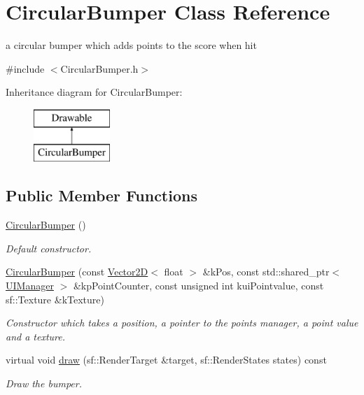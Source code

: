 \hypertarget{class_circular_bumper}{\section{Circular\+Bumper Class Reference}
\label{class_circular_bumper}
}


a circular bumper which adds points to the score when hit  




{\ttfamily \#include $<$Circular\+Bumper.\+h$>$}

Inheritance diagram for Circular\+Bumper\+:\begin{figure}[H]
\begin{center}
\leavevmode
\includegraphics[height=2.000000cm]{class_circular_bumper}
\end{center}
\end{figure}
\subsection*{Public Member Functions}
\begin{DoxyCompactItemize}
\item 
\hypertarget{class_circular_bumper_a4b34986d6fa0dbaef189d87fac04ccfb}{\hyperlink{class_circular_bumper_a4b34986d6fa0dbaef189d87fac04ccfb}{Circular\+Bumper} ()}\label{class_circular_bumper_a4b34986d6fa0dbaef189d87fac04ccfb}

\begin{DoxyCompactList}\small\item\em Default constructor. \end{DoxyCompactList}\item 
\hyperlink{class_circular_bumper_af51b2361c3e0851abf547ccd305fded0}{Circular\+Bumper} (const \hyperlink{class_vector2_d}{Vector2\+D}$<$ float $>$ \&k\+Pos, const std\+::shared\+\_\+ptr$<$ \hyperlink{class_u_i_manager}{U\+I\+Manager} $>$ \&kp\+Point\+Counter, const unsigned int kui\+Pointvalue, const sf\+::\+Texture \&k\+Texture)
\begin{DoxyCompactList}\small\item\em Constructor which takes a position, a pointer to the points manager, a point value and a texture. \end{DoxyCompactList}\item 
virtual void \hyperlink{class_circular_bumper_a06077fa0e0bfdaa4b511cbd8f2a8c12d}{draw} (sf\+::\+Render\+Target \&target, sf\+::\+Render\+States states) const 
\begin{DoxyCompactList}\small\item\em Draw the bumper. \end{DoxyCompactList}\end{DoxyCompactItemize}

